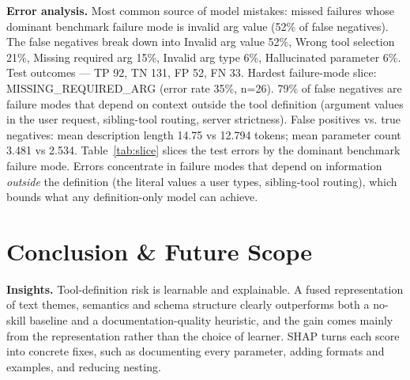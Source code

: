 \documentclass[conference]{IEEEtran}
\begin{document}
\textbf{Error analysis.} Most common source of model mistakes: missed failures whose dominant benchmark failure mode is invalid arg value (52\% of false negatives). The false negatives break down into Invalid arg value 52\%, Wrong tool selection 21\%, Missing required arg 15\%, Invalid arg type 6\%, Hallucinated parameter 6\%. Test outcomes — TP 92, TN 131, FP 52, FN 33. Hardest failure-mode slice: MISSING\_REQUIRED\_ARG (error rate 35\%, n=26). 79\% of false negatives are failure modes that depend on context outside the tool definition (argument values in the user request, sibling-tool routing, server strictness). False positives vs. true negatives: mean description length 14.75 vs 12.794 tokens; mean parameter count 3.481 vs 2.534. Table~\ref{tab:slice} slices the test errors by the dominant benchmark failure mode. Errors concentrate in failure modes that depend on information \emph{outside} the definition (the literal values a user types, sibling-tool routing), which bounds what any definition-only model can achieve.

\begin{table}[t]\centering\caption{Test errors by dominant failure mode (misclassification rate, positive rate, false negatives and false positives)}\label{tab:slice}
\end{table}

\section{Conclusion \& Future Scope}
\textbf{Insights.} Tool-definition risk is learnable and explainable. A fused representation of text themes, semantics and schema structure clearly outperforms both a no-skill baseline and a documentation-quality heuristic, and the gain comes mainly from the representation rather than the choice of learner. SHAP turns each score into concrete fixes, such as documenting every parameter, adding formats and examples, and reducing nesting.
\end{document}
